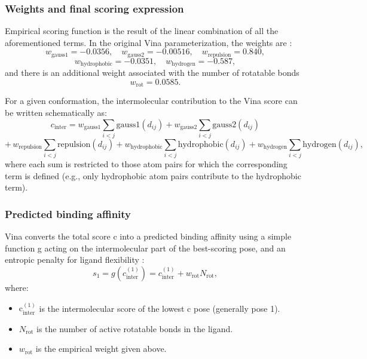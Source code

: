 \documentclass[12pt, a4paper]{article}
\begin{document}
\subsubsection{Weights and final scoring expression}
Empirical scoring function is the result of the linear combination of all the aforementioned terms.
In the original Vina parameterization, the weights are \cite{CH7_trott2010vina}:
\[
  w_{\text{gauss1}} = -0.0356,\quad
  w_{\text{gauss2}} = -0.00516,\quad
  w_{\text{repulsion}} = 0.840,
\]
\[
  w_{\text{hydrophobic}} = -0.0351,\quad
  w_{\text{hydrogen}} = -0.587,
\]
and there is an additional weight associated with the number of rotatable bonds
\[
  w_{\text{rot}} = 0.0585.
\]

For a given conformation, the intermolecular contribution to the Vina score can be written schematically as:
\[
  c_{\text{inter}} =
    w_{\text{gauss1}} \sum_{i < j} \text{gauss1}\!\left(d_{ij}\right)
  + w_{\text{gauss2}} \sum_{i < j} \text{gauss2}\!\left(d_{ij}\right)
\]
\[
  +\, w_{\text{repulsion}} \sum_{i < j} \text{repulsion}\!\left(d_{ij}\right)
  + w_{\text{hydrophobic}} \sum_{i < j} \text{hydrophobic}\!\left(d_{ij}\right)
  + w_{\text{hydrogen}} \sum_{i < j} \text{hydrogen}\!\left(d_{ij}\right),
\]
where each sum is restricted to those atom pairs for which the corresponding term is defined (e.g., only hydrophobic atom pairs contribute to the hydrophobic term).



\subsubsection{Predicted binding affinity}

Vina converts the total score c into a predicted binding affinity using a simple function g acting on the intermolecular part of the best-scoring pose, and an entropic penalty for ligand flexibility \cite{CH7_trott2010vina}:
\[
  s_1 = g\!\left(c_{\text{inter}}^{(1)}\right) = c_{\text{inter}}^{(1)} + w_{\text{rot}} N_{\text{rot}},
\]
where:
\begin{itemize}
  \item $\text{c}_{\text{inter}}^{(1)}$ is the intermolecular score of the lowest c pose (generally pose 1).
  \item $N_{\text{rot}}$ is the number of active rotatable bonds in the ligand.
  \item $w_{\text{rot}}$ is the empirical weight given above.
\end{itemize}
\end{document}
